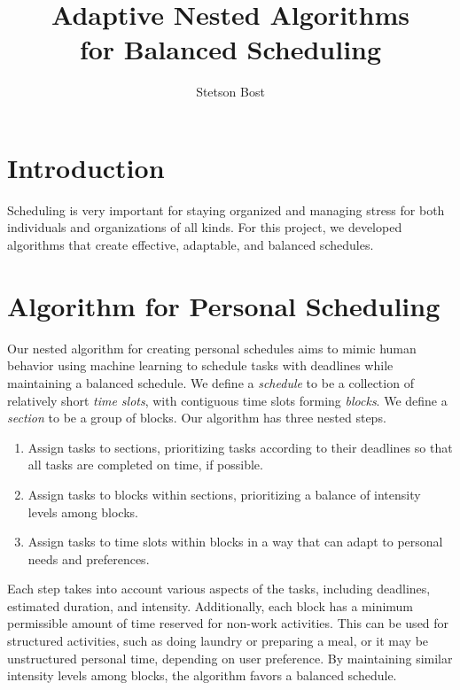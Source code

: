 \documentclass[thesis]{hmcposter}
\author{Stetson Bost}
\title{Adaptive Nested Algorithms\\for Balanced Scheduling}
\begin{document}
\begin{poster}

\section{Introduction}
Scheduling is very important for staying organized and managing stress for both individuals and organizations of all kinds.
For this project, we developed algorithms that create effective, adaptable, and balanced schedules.

\section{Algorithm for Personal Scheduling}
Our nested algorithm for creating personal schedules aims to mimic human behavior using machine learning to schedule tasks with deadlines while maintaining a balanced schedule.
We define a \emph{schedule} to be a collection of relatively short \emph{time slots}, with contiguous time slots forming \emph{blocks}.
We define a \emph{section} to be a group of blocks.
Our algorithm has three nested steps.
\begin{enumerate}
	\item
		Assign tasks to sections, prioritizing tasks according to their deadlines so that all tasks are completed on time, if possible.
	\item
		Assign tasks to blocks within sections, prioritizing a balance of intensity levels among blocks.
	\item
		Assign tasks to time slots within blocks in a way that can adapt to personal needs and preferences.
\end{enumerate}
Each step takes into account various aspects of the tasks, including deadlines, estimated duration, and intensity. Additionally, each block has a minimum permissible amount of time reserved for non-work activities. This can be used for structured activities, such as doing laundry or preparing a meal, or it may be unstructured personal time, depending on user preference.
By maintaining similar intensity levels among blocks, the algorithm favors a balanced schedule.


\end{poster}
\end{document}
